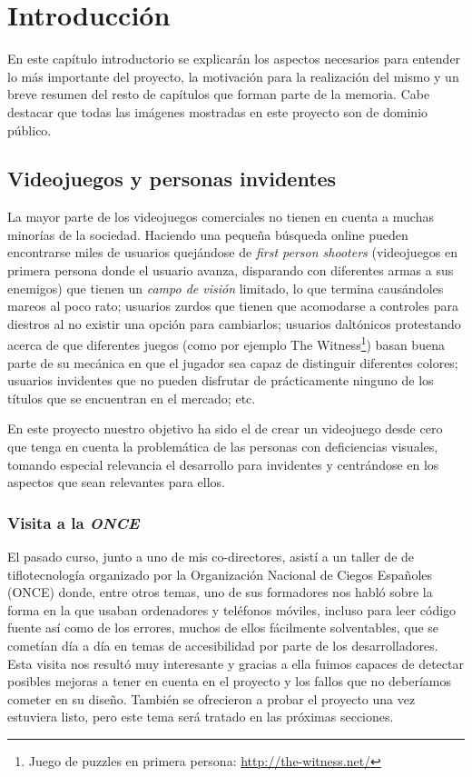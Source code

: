 \chapter[Introdución]{Introducción}

En este capítulo introductorio se explicarán los aspectos necesarios para entender lo más importante del proyecto, la motivación para la realización del mismo y un breve resumen del resto de capítulos que forman parte de la memoria.
Cabe destacar que todas las imágenes mostradas en este proyecto son de dominio público.

\section{Videojuegos y personas invidentes}
La mayor parte de los videojuegos comerciales no tienen en cuenta a muchas minorías de la sociedad. Haciendo una pequeña búsqueda online pueden encontrarse miles de usuarios quejándose de \textit{first person shooters} (videojuegos en primera persona donde el usuario avanza, disparando con diferentes armas a sus enemigos) que tienen un \textit{campo de visión} limitado, lo que termina causándoles mareos al poco rato; usuarios zurdos que tienen que acomodarse a controles para diestros al no existir una opción para cambiarlos; usuarios daltónicos protestando acerca de que diferentes juegos (como por ejemplo The Witness\footnote{Juego de puzzles en primera persona: \url{http://the-witness.net/}}) basan buena parte de su mecánica en que el jugador sea capaz de distinguir diferentes colores; usuarios invidentes que no pueden disfrutar de prácticamente ninguno de los títulos que se encuentran en el mercado; etc.

En este proyecto nuestro objetivo ha sido el de crear un videojuego desde cero que tenga en cuenta la problemática de las personas con deficiencias visuales, tomando especial relevancia el desarrollo para invidentes y centrándose en los aspectos que sean relevantes para ellos.

\subsection{Visita a la \textit{ONCE}}
El pasado curso, junto a uno de mis co-directores, asistí a un taller de de tiflotecnología organizado por la Organización Nacional de Ciegos Españoles (ONCE) donde, entre otros temas, uno de sus formadores nos habló sobre la forma en la que usaban ordenadores y teléfonos móviles, incluso para leer código fuente así como de los errores, muchos de ellos fácilmente solventables, que se cometían día a día en temas de accesibilidad por parte de los desarrolladores. Esta visita nos resultó muy interesante y gracias a ella fuimos capaces de detectar posibles mejoras a tener en cuenta en el proyecto y los fallos que no deberíamos cometer en su diseño. También se ofrecieron a probar el proyecto una vez estuviera listo, pero este tema será tratado en las próximas secciones.

